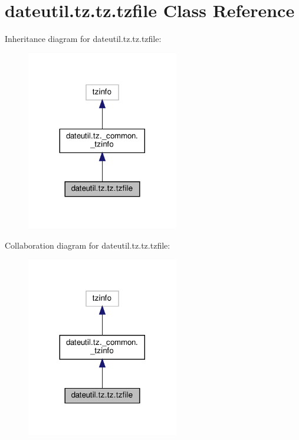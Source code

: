 \hypertarget{classdateutil_1_1tz_1_1tz_1_1tzfile}{}\section{dateutil.\+tz.\+tz.\+tzfile Class Reference}
\label{classdateutil_1_1tz_1_1tz_1_1tzfile}


Inheritance diagram for dateutil.\+tz.\+tz.\+tzfile\+:
\nopagebreak
\begin{figure}[H]
\begin{center}
\leavevmode
\includegraphics[width=188pt]{classdateutil_1_1tz_1_1tz_1_1tzfile__inherit__graph}
\end{center}
\end{figure}


Collaboration diagram for dateutil.\+tz.\+tz.\+tzfile\+:
\nopagebreak
\begin{figure}[H]
\begin{center}
\leavevmode
\includegraphics[width=188pt]{classdateutil_1_1tz_1_1tz_1_1tzfile__coll__graph}
\end{center}
\end{figure}
